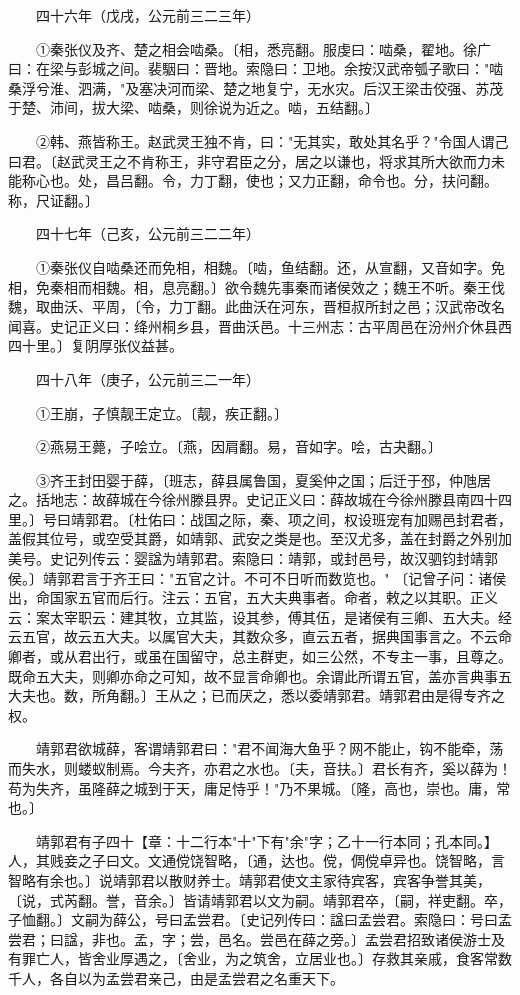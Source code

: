 　　四十六年（戊戌，公元前三二三年）

　　①秦张仪及齐、楚之相会啮桑。〔相，悉亮翻。服虔曰：啮桑，翟地。徐广曰：在梁与彭城之间。裴駰曰：晋地。索隐曰：卫地。余按汉武帝瓠子歌曰："啮桑浮兮淮、泗满，"及塞决河而梁、楚之地复宁，无水灾。后汉王梁击佼强、苏茂于楚、沛间，拔大梁、啮桑，则徐说为近之。啮，五结翻。〕

　　②韩、燕皆称王。赵武灵王独不肯，曰："无其实，敢处其名乎？"令国人谓己曰君。〔赵武灵王之不肯称王，非守君臣之分，居之以谦也，将求其所大欲而力未能称心也。处，昌吕翻。令，力丁翻，使也；又力正翻，命令也。分，扶问翻。称，尺证翻。〕

　　四十七年（己亥，公元前三二二年）

　　①秦张仪自啮桑还而免相，相魏。〔啮，鱼结翻。还，从宣翻，又音如字。免相，免秦相而相魏。相，息亮翻。〕欲令魏先事秦而诸侯效之；魏王不听。秦王伐魏，取曲沃、平周，〔令，力丁翻。此曲沃在河东，晋桓叔所封之邑；汉武帝改名闻喜。史记正义曰：绛州桐乡县，晋曲沃邑。十三州志：古平周邑在汾州介休县西四十里。〕复阴厚张仪益甚。

　　四十八年（庚子，公元前三二一年）

　　①王崩，子慎靓王定立。〔靓，疾正翻。〕

　　②燕易王薨，子哙立。〔燕，因肩翻。易，音如字。哙，古夬翻。〕

　　③齐王封田婴于薛，〔班志，薛县属鲁国，夏奚仲之国；后迁于邳，仲虺居之。括地志：故薛城在今徐州滕县界。史记正义曰：薛故城在今徐州滕县南四十四里。〕号曰靖郭君。〔杜佑曰：战国之际，秦、项之间，权设班宠有加赐邑封君者，盖假其位号，或空受其爵，如靖郭、武安之类是也。至汉尤多，盖在封爵之外别加美号。史记列传云：婴諡为靖郭君。索隐曰：靖郭，或封邑号，故汉驷钧封靖郭侯。〕靖郭君言于齐王曰："五官之计。不可不日听而数览也。" 〔记曾子问：诸侯出，命国家五官而后行。注云：五官，五大夫典事者。命者，敕之以其职。正义云：案太宰职云：建其牧，立其监，设其参，傅其伍，是诸侯有三卿、五大夫。经云五官，故云五大夫。以属官大夫，其数众多，直云五者，据典国事言之。不云命卿者，或从君出行，或虽在国留守，总主群吏，如三公然，不专主一事，且尊之。既命五大夫，则卿亦命之可知，故不显言命卿也。余谓此所谓五官，盖亦言典事五大夫也。数，所角翻。〕王从之；已而厌之，悉以委靖郭君。靖郭君由是得专齐之权。

　　靖郭君欲城薛，客谓靖郭君曰："君不闻海大鱼乎？网不能止，钩不能牵，荡而失水，则蝼蚁制焉。今夫齐，亦君之水也。〔夫，音扶。〕君长有齐，奚以薛为！苟为失齐，虽隆薛之城到于天，庸足恃乎！"乃不果城。〔隆，高也，崇也。庸，常也。〕

　　靖郭君有子四十【章：十二行本"十"下有"余"字；乙十一行本同；孔本同。】人，其贱妾之子曰文。文通傥饶智略，〔通，达也。傥，倜傥卓异也。饶智略，言智略有余也。〕说靖郭君以散财养士。靖郭君使文主家待宾客，宾客争誉其美，〔说，式芮翻。誉，音余。〕皆请靖郭君以文为嗣。靖郭君卒，〔嗣，祥吏翻。卒，子恤翻。〕文嗣为薛公，号曰孟尝君。〔史记列传曰：諡曰孟尝君。索隐曰：号曰孟尝君；曰諡，非也。孟，字；尝，邑名。尝邑在薛之旁。〕孟尝君招致诸侯游士及有罪亡人，皆舍业厚遇之，〔舍业，为之筑舍，立居业也。〕存救其亲戚，食客常数千人，各自以为孟尝君亲己，由是孟尝君之名重天下。

